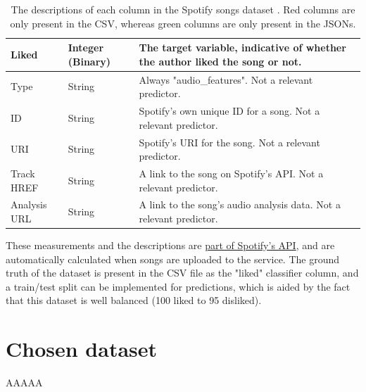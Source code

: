 \documentclass[12pt]{report}
\begin{document}
\begin{table}[H]
\begin{tabular}{ |p{}|p{}| p{}|}
            \hline
            \cellcolor{red!15}Liked & Integer (Binary) & The target variable, indicative of whether the author liked the song or not.\\
            \hline
            \cellcolor{green!15}Type & String & Always "audio\_features". Not a relevant predictor.\\
            \hline
            \cellcolor{green!15}ID & String & Spotify's own unique ID for a song. Not a relevant predictor.\\
            \hline
            \cellcolor{green!15}URI & String & Spotify's URI for the song. Not a relevant predictor.\\
            \hline
            \cellcolor{green!15}Track HREF & String & A link to the song on Spotify's API. Not a relevant predictor.\\  
            \hline
            \cellcolor{green!15}Analysis URL & String & A link to the song's audio analysis data. Not a relevant predictor. \\
            \hline
    \end{tabular}
    \caption{The descriptions of each column in the Spotify songs dataset \autocite{spotify_web_nodate}. Red columns are only present in the CSV, whereas green columns are only present in the JSONs.}\label{tab:Spotify-Types}
\end{table}

These measurements and the descriptions are \href{https://developer.spotify.com/documentation/web-api/reference/get-audio-features}{part of Spotify's API},
and are automatically calculated when songs are uploaded to the service. The ground truth of the dataset is present in the CSV file as the "liked" classifier 
column, and a train/test split can be implemented for predictions, which is aided by the fact that this dataset is well balanced (100 liked to 95 disliked).

\section{Chosen dataset}
AAAAA
\end{document}
